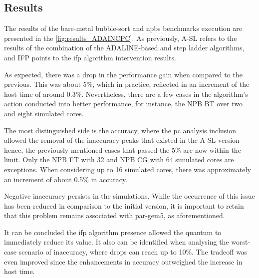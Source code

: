 \subsection{Results}

The results of the bare-metal bubble-sort and \glspl{npb} benchmarks execution are presented in the \autoref{fig:results_ADAINCPC}. As previously, 
A-SL refers to the results of the combination of the ADALINE-based and step ladder algorithms, and IFP points to the 
\gls{ifp} algorithm intervention results.

As expected, there was a drop in the performance gain when compared to the previous. This was about 5\%, which in practice, 
reflected in an increment of the host time of around 0.3\%. Nevertheless, there are a few cases in the algorithm's action 
conducted into better performance, for instance, the NPB BT over two and eight simulated cores. 

The most distinguished side is the accuracy, where the \gls{pc} analysis inclusion allowed the removal of the inaccuracy peaks that existed 
in the A-SL version hence, the previously mentioned cases that passed the 5\% are now within the limit. Only the NPB FT with 32
and NPB CG with 64 simulated cores are exceptions. When considering up to 16 simulated cores, there was approximately an increment 
of about 0.5\% in accuracy. 

Negative inaccuracy persists in the simulations. While the occurrence of this issue has been reduced in comparison to the initial version, 
it is important to retain that this problem remains associated with par-gem5, as aforementioned. 

It can be concluded the \gls{ifp} algorithm presence allowed the quantum to immediately reduce its value. It also can be identified when 
analysing the worst-case scenario of inaccuracy, where drops can reach up to 10\%. The tradeoff was even improved since 
the enhancements in accuracy outweighed the increase in host time.

